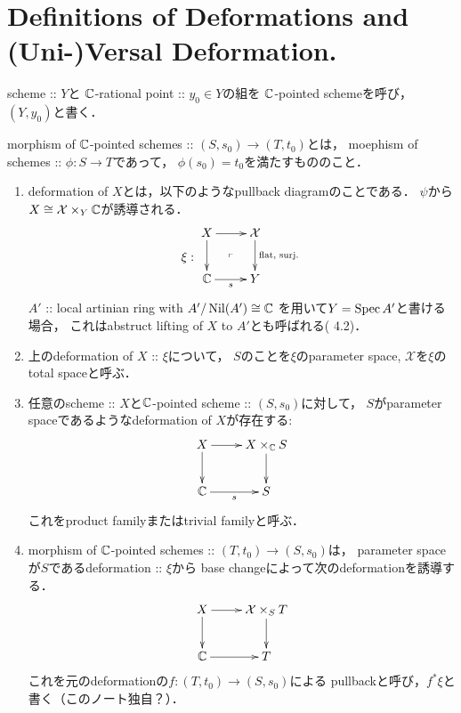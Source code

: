 \documentclass[a4paper]{jsarticle}
\newcommand{\famX}{\mathcal{X}}
\begin{document}
    \section{Definitions of Deformations and (Uni-)Versal Deformation.}
\begin{Def}
    scheme :: $Y$と
    $\mathbb{C}$-rational point :: $y_0 \in Y$の組を
    $\mathbb{C}$-pointed schemeを呼び，$(Y, y_0)$と書く．

    morphism of $\mathbb{C}$-pointed schemes :: $(S, s_0) \to (T, t_0)$とは，
    moephism of schemes :: $\phi: S \to T$であって，
    $\phi(s_0)=t_0$を満たすもののこと．
\end{Def}

\begin{Def}
    \begin{enumerate}[label=(\roman*), leftmargin=*]
    \item 
        deformation of $X$とは，以下のようなpullback diagramのことである．
        $\psi$から$X \iso \famX \times_{Y} \C$が誘導される．
        \[
            \xi:
        \vcenter{\xymatrix{
            X \ar[r] \ar[d]& \famX \ar[d]^-{\text{flat, surj.}} \\
            \C \ar[r]_-{s}& Y
            \ar@{}[lu]|{\ulcorner}
        }}
        \]
        $A'$ :: local artinian ring with $A'/\operatorname{Nil}(A') \cong \mathbb{C}$
        を用いて$Y=\operatorname{Spec} A'$と書ける場合，
        これはabstruct lifting of $X$ to $A'$とも呼ばれる(\cite{DefLCI} 4.2)．

    \item
        上のdeformation of $X$ :: $\xi$について，
        $S$のことを$\xi$のparameter space,
        $\famX$を$\xi$のtotal spaceと呼ぶ．

    \item
        任意のscheme :: $X$と$\mathbb{C}$-pointed scheme :: $(S, s_0)$に対して，
        $S$がparameter spaceであるようなdeformation of $X$が存在する:
        \[\xymatrix{
                X \ar[r]\ar[d]& X \times_{\C} S \ar[d]\\
                \C \ar[r]_-{s}& S
        }\]
        これをproduct familyまたはtrivial familyと呼ぶ．

    \item
        morphism of $\mathbb{C}$-pointed schemes :: $(T, t_0) \to (S, s_0)$は，
        parameter spaceが$S$であるdeformation :: $\xi$から
        base changeによって次のdeformationを誘導する．
        \[\xymatrix{
            X \ar[r]\ar[d]& \famX \times_S T \ar[d]\\
            \C \ar[r]& T
        }\]
        これを元のdeformationの$f: (T, t_0) \to (S, s_0)$による
        pullbackと呼び，$f^* \xi$と書く（このノート独自？）．


\end{enumerate}
\end{Def}
\end{document}
